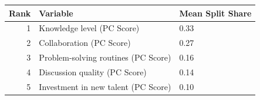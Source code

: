 
\begin{tabular}{rll}
\toprule
Rank & Variable & Mean Split Share\\
\midrule
1 & Knowledge level (PC Score) & 0.33\\
2 & Collaboration (PC Score) & 0.27\\
3 & Problem-solving routines (PC Score) & 0.16\\
4 & Discussion quality (PC Score) & 0.14\\
5 & Investment in new talent (PC Score) & 0.10\\
\bottomrule
\end{tabular}
